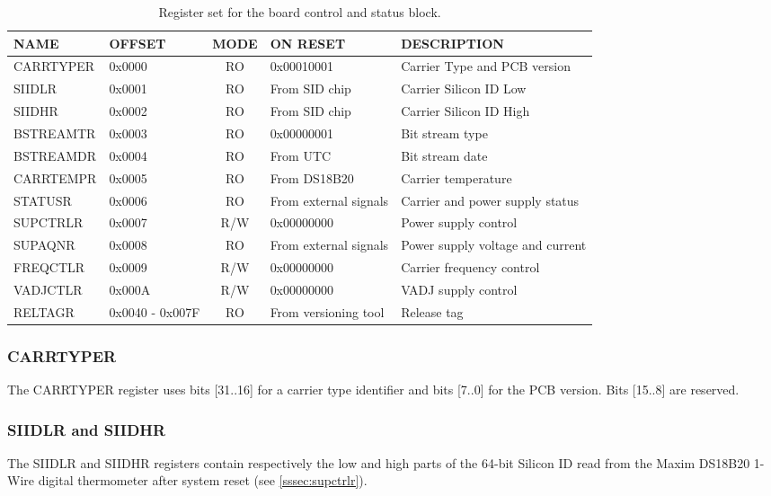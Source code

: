 \documentclass[a4paper]{article}
\begin{document}
\begin{table}[htbp]
  \centering
  \begin{tabular}{|l|p{1.5cm}|c|p{2cm}|p{3cm}|}
    \hline
    \textbf{NAME} & \textbf{OFFSET} & \textbf{MODE} & \textbf{ON RESET} & \textbf{DESCRIPTION} \\
    \hline
    \hline
    CARRTYPER & 0x0000 & RO & 0x00010001 & Carrier Type and PCB version\\
    \hline
    SIIDLR & 0x0001 & RO & From SID chip & Carrier Silicon ID Low \\
    \hline
    SIIDHR & 0x0002 & RO & From SID chip & Carrier Silicon ID High \\
    \hline
    BSTREAMTR & 0x0003 & RO & 0x00000001 & Bit stream type \\
    \hline
    BSTREAMDR & 0x0004 & RO & From UTC & Bit stream date \\
    \hline
    CARRTEMPR & 0x0005 & RO & From DS18B20 & Carrier temperature \\
    \hline
    STATUSR & 0x0006 & RO & From external signals & Carrier and power supply status \\
    \hline
    SUPCTRLR & 0x0007 & R/W & 0x00000000 & Power supply control \\
    \hline
    SUPAQNR & 0x0008 & RO & From external signals & Power supply voltage and current \\
    \hline
    FREQCTLR & 0x0009 & R/W & 0x00000000 & Carrier frequency control \\
    \hline
    VADJCTLR & 0x000A & R/W & 0x00000000 & VADJ supply control \\
    \hline
    RELTAGR & 0x0040 - 0x007F & RO & From versioning tool & Release tag \\
    \hline
  \end{tabular}
  \caption{Register set for the board control and status block.}
  \label{tab:stat_control}
\end{table}

\subsubsection{CARRTYPER}
The CARRTYPER register uses bits [31..16] for a carrier type identifier and bits [7..0] for the PCB version. Bits [15..8] are reserved. 

\subsubsection{SIIDLR and SIIDHR}
The SIIDLR and SIIDHR registers contain respectively the low and high parts of the 64-bit Silicon ID read from the Maxim DS18B20 1-Wire digital thermometer after system reset (see \ref{sssec:supctrlr}). 
\end{document}

